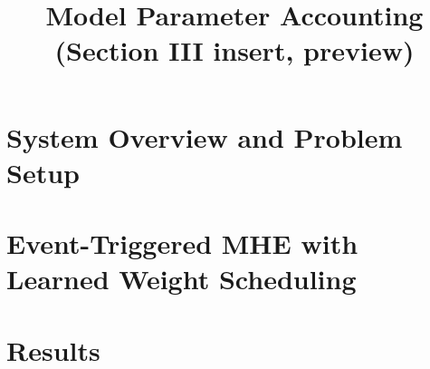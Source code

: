 \documentclass[conference]{IEEEtran}
\begin{document}
\title{Model Parameter Accounting (Section III insert, preview)}
\author{}
\maketitle

\section{System Overview and Problem Setup}\label{sec:setup}
\section{Event-Triggered MHE with Learned Weight Scheduling}\label{sec:method}
\section{Results}\label{sec:results}
\setcounter{section}{2}


\end{document}
